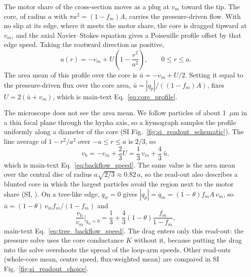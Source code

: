 The motor share of the cross-section moves as a plug at $v_m$ toward the tip. The core, of radius $a$ with $\pi a^2 = (1-f_m)A$, carries the pressure-driven flow. With no slip at its edge, where it meets the motor share, the core is dragged tipward at $v_m$, and the axial Navier--Stokes equation gives a Poiseuille profile offset by that edge speed. Taking the rootward direction as positive,
\begin{equation}
u(r) = -v_m + U\left(1 - \frac{r^2}{a^2}\right), \qquad 0 \leq r \leq a.
\end{equation}
The area mean of this profile over the core is $\bar{u} = -v_m + U/2$. Setting it equal to the pressure-driven flux over the core area, $\bar{u} = |q_p|/((1-f_m)A)$, fixes $U = 2(\bar{u} + v_m)$, which is main-text Eq.~\eqref{eq:core_profile}.

The microscope does not see the area mean. We follow particles of about 1~$\mu$m in a thin focal plane through the hypha axis, so a kymograph samples the profile uniformly along a diameter of the core (SI Fig.~\ref{fig:si_readout_schematic}). The line average of $1 - r^2/a^2$ over $-a \leq r \leq a$ is $2/3$, so
\begin{equation}
v_\mathrm{b} = -v_m + \frac{2}{3}U = \frac{1}{3}\,v_m + \frac{4}{3}\,\bar{u},
\end{equation}
which is main-text Eq.~\eqref{eq:backflow_speed}. The same value is the area mean over the central disc of radius $a\sqrt{2/3} \approx 0.82\,a$, so the read-out also describes a blunted core in which the largest particles avoid the region next to the motor share (SI, ).
On a tree-like edge, $q_w = 0$ gives $|q_p| = q_m = (1-\theta) f_m A\, v_m$, so $\bar{u} = (1-\theta)\, v_m f_m/(1-f_m)$ and
\begin{equation}
\frac{v_\mathrm{b}}{v_m}\bigg|_{q_w = 0} = \frac{1}{3} + \frac{4}{3}(1-\theta)\frac{f_m}{1-f_m},
\end{equation}
main-text Eq.~\eqref{eq:tree_backflow_speed}. The drag enters only this read-out: the pressure solve uses the core conductance $K$ without it, because putting the drag into the solve overshoots the spread of the loop-arm speeds. Other read-outs (whole-core mean, centre speed, flux-weighted mean) are compared in SI Fig.~\ref{fig:si_readout_choice}.

